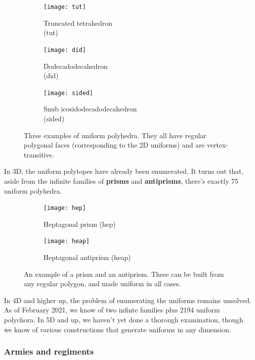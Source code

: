 \documentclass{article}
\begin{document}
\begin{figure}[H]
\centering
\begin{subfigure}{.33333\textwidth}
  \centering
  \texttt{[image: tut]}
  \caption{Truncated tetrahedron\\(tut)}
  \label{fig:tut}
\end{subfigure}%
\begin{subfigure}{.33333\textwidth}
  \centering
  \texttt{[image: did]}
  \caption{Dodecadodecahedron\\(did)}
  \label{fig:did}
\end{subfigure}%
\begin{subfigure}{.33333\textwidth}
  \centering
  \texttt{[image: sided]}
  \caption{Snub icosidodecadodecahedron\\(sided)}
  \label{fig:sided}
\end{subfigure}%
\caption{Three examples of uniform polyhedra. They all have regular polygonal faces (corresponding to the 2D uniforms) and are vertex-transitive.}
\label{fig:uniforms3D}
\end{figure}

In 3D, the uniform polytopes have already been enumerated. It turns out that, aside from the infinite families of \textbf{prisms} and \textbf{antiprisms}, there's exactly 75 uniform polyhedra. %

\begin{figure}[H]
\centering
\begin{subfigure}{.5\textwidth}
  \centering
  \texttt{[image: hep]}
  \caption{Heptagonal prism (hep)}
  \label{fig:hep}
\end{subfigure}%
\begin{subfigure}{.5\textwidth}
  \centering
  \texttt{[image: heap]}
  \caption{Heptagonal antiprism (heap)}
  \label{fig:heap}
\end{subfigure}%
\caption{An example of a prism and an antiprism. These can be built from any regular polygon, and made uniform in all cases.}
\label{fig:prisms}
\end{figure}

In 4D and higher up, the problem of enumerating the uniforms remains unsolved. As of February 2021, we know of two infinte families plus 2194 uniform polychora. In 5D and up, we haven't yet done a thorough examination, though we know of various constructions that generate uniforms in any dimension.

\subsubsection{Armies and regiments}
\end{document}

